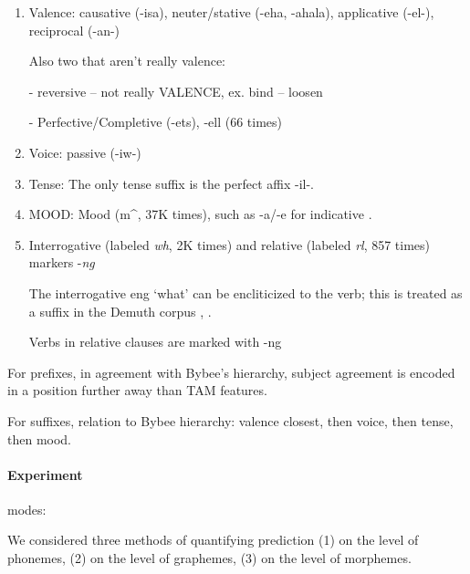     \begin{enumerate}
    \item Valence: causative (-isa),  neuter/stative (-eha, -ahala), applicative (-el-), reciprocal (-an-)
    
    
    Also two that aren't really valence:
    
    - reversive \cite[]{doke1967textbook} -- not really VALENCE, ex. bind -- loosen
    
    -  Perfective/Completive (-ets), -ell (66 times) \cite[]{doke1967textbook}
    

    \item Voice: passive (-iw-)
    
    
    \item Tense: The only tense suffix is the perfect affix -il-.

     
    \item MOOD: Mood (m\^{}, 37K times), such as -a/-e for indicative \citep{demuth1992acquisition}.
    

    \item Interrogative (labeled \textit{wh}, 2K times) and relative (labeled \textit{rl}, 857 times) markers -\textit{ng}
    
    The interrogative eng `what' can be encliticized to the verb; this is treated as a suffix in the Demuth corpus \cite[p. 168]{guma1971handbook}, \cite[, 320]{doke1967textbook}.
    
    Verbs in relative clauses are marked with -ng \cite[, 793]{doke1967textbook}

\end{enumerate}



For prefixes, in agreement with Bybee's hierarchy, subject agreement is encoded in a position further away than TAM features.

For suffixes,
relation to Bybee hierarchy: valence closest, then voice, then tense, then mood.




\paragraph{Experiment}

modes:

We considered three methods of quantifying prediction
(1) on the level of phonemes, (2) on the level of graphemes, (3) on the level of morphemes.

